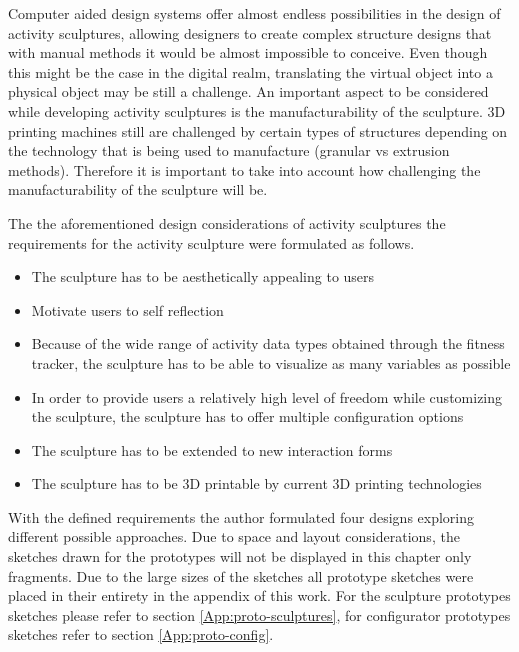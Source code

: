 \documentclass[../medieninformatik-arbeit.tex]{subfiles}
\begin{document}
Computer aided design systems offer almost endless possibilities in the design of activity sculptures, allowing designers to create complex structure designs that with manual methods it would be almost impossible to conceive.  Even though this might be the case in the digital realm, translating the virtual object into a physical object may be still a challenge. An important aspect to be considered while developing activity sculptures is the manufacturability of the sculpture\cite{swaminathan2014supporting}. 3D printing machines still are challenged by certain types of structures depending on the technology that is being used to manufacture (granular vs extrusion methods). Therefore it is important to take into account how challenging the manufacturability of the sculpture will be.

The the aforementioned design considerations of activity sculptures the requirements for the activity sculpture were formulated as follows. 

\begin{itemize}
	\item The sculpture has to be aesthetically appealing to users
	\item Motivate users to self reflection
	\item Because of the wide range of activity data types obtained through the fitness tracker, the sculpture has to be able to visualize as many variables as possible
	\item In order to provide users a relatively high level of freedom while customizing the sculpture, the sculpture has to offer multiple configuration options
	\item The sculpture has to be extended to new interaction forms
	\item The sculpture has to be 3D printable by current 3D printing technologies
\end{itemize}

With the defined requirements the author formulated four designs exploring different possible approaches. Due to space and layout considerations, the sketches drawn for the prototypes will not be displayed in this chapter only fragments. Due to the large sizes of the sketches all prototype sketches were placed in their entirety in the appendix of this work. For the sculpture prototypes sketches please refer to section \ref{App:proto-sculptures}, for configurator prototypes sketches refer to section \ref{App:proto-config}.
\end{document}
